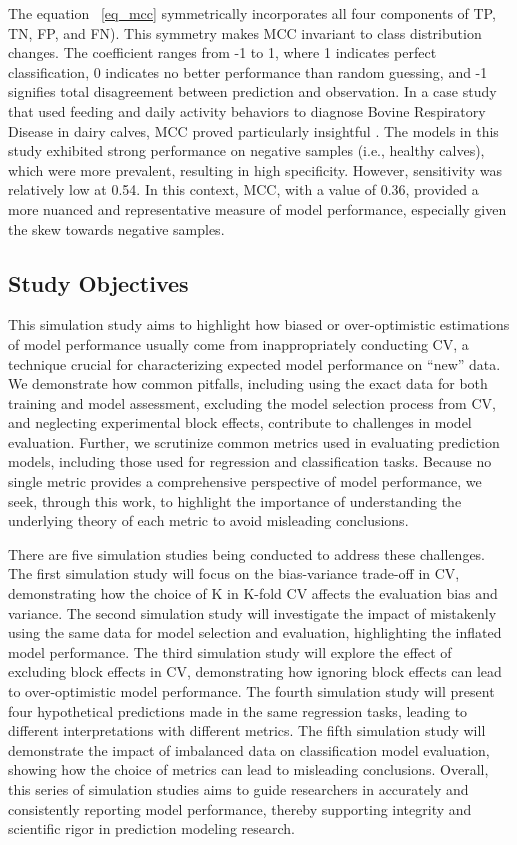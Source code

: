 The equation ~\ref{eq_mcc} symmetrically incorporates all four components of TP, TN, FP, and FN). This symmetry makes MCC invariant to class distribution changes. The coefficient ranges from -1 to 1, where 1 indicates perfect classification, 0 indicates no better performance than random guessing, and -1 signifies total disagreement between prediction and observation. In a case study that used feeding and daily activity behaviors to diagnose Bovine Respiratory Disease in dairy calves, MCC proved particularly insightful \citep{bowen_early_2021}. The models in this study exhibited strong performance on negative samples (i.e., healthy calves), which were more prevalent, resulting in high specificity. However, sensitivity was relatively low at 0.54. In this context, MCC, with a value of 0.36, provided a more nuanced and representative measure of model performance, especially given the skew towards negative samples.

\subsection{Study Objectives}

This simulation study aims to highlight how biased or over-optimistic estimations of model performance usually come from inappropriately conducting CV, a technique crucial for characterizing expected model performance on “new” data. We demonstrate how common pitfalls, including using the exact data for both training and model assessment, excluding the model selection process from CV, and neglecting experimental block effects, contribute to challenges in model evaluation. Further, we scrutinize common metrics used in evaluating prediction models, including those used for regression and classification tasks. Because no single metric provides a comprehensive perspective of model performance, we seek, through this work, to highlight the importance of understanding the underlying theory of each metric to avoid misleading conclusions.

There are five simulation studies being conducted to address these challenges. The first simulation study will focus on the bias-variance trade-off in CV, demonstrating how the choice of K in K-fold CV affects the evaluation bias and variance. The second simulation study will investigate the impact of mistakenly using the same data for model selection and evaluation, highlighting the inflated model performance. The third simulation study will explore the effect of excluding block effects in CV, demonstrating how ignoring block effects can lead to over-optimistic model performance. The fourth simulation study will present four hypothetical predictions made in the same regression tasks, leading to different interpretations with different metrics. The fifth simulation study will demonstrate the impact of imbalanced data on classification model evaluation, showing how the choice of metrics can lead to misleading conclusions. Overall, this series of simulation studies aims to guide researchers in accurately and consistently reporting model performance, thereby supporting integrity and scientific rigor in prediction modeling research.
